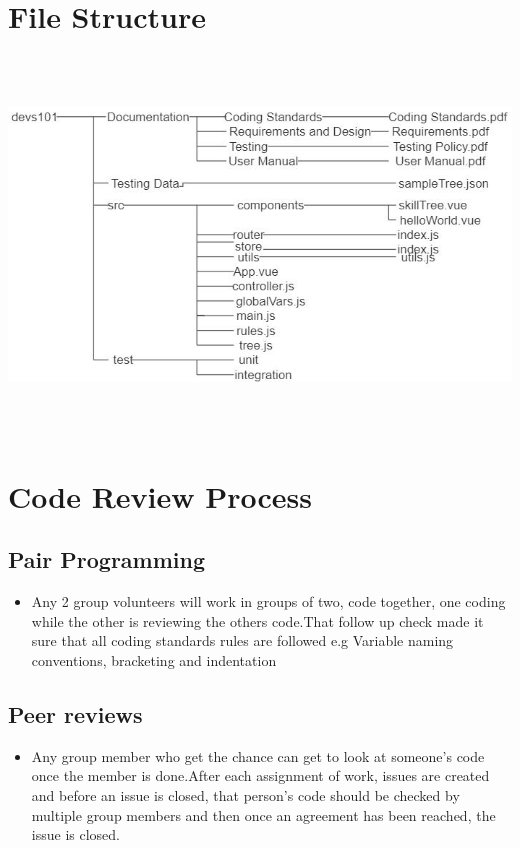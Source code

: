 \documentclass[12pt]{article}
\begin{document}
	\section{File Structure}
	\includegraphics[width=15cm, height=10cm]{images/filestructure.jpg}\\ 
	
	\section{Code Review Process}
	\subsection{Pair Programming}
	\begin{itemize}
	\item Any 2 group volunteers will work in groups of two, code together, one coding while the other is 		reviewing the others code.That follow up check made it sure that all coding standards rules are 			followed e.g Variable naming conventions, bracketing and indentation
	\end{itemize}
	
	\subsection{Peer reviews}
	\begin{itemize}
	\item Any group member who get the chance can get to look at someone's code once the member is done.After each assignment of work, issues are created and before an issue is closed, that person's code should be checked by multiple group members and then once an agreement has been reached, the issue is closed.
	\end{itemize}
\end{document}
